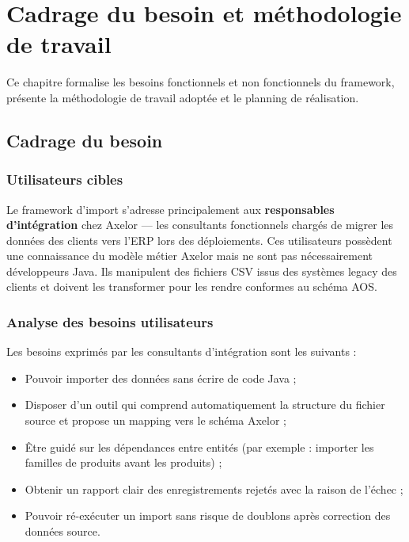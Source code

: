 \chapter{Cadrage du besoin et méthodologie de travail}
\label{chap:cadrage}

Ce chapitre formalise les besoins fonctionnels et non fonctionnels du framework, présente la méthodologie de travail adoptée et le planning de réalisation.

\section{Cadrage du besoin}

\subsection{Utilisateurs cibles}

Le framework d'import s'adresse principalement aux \textbf{responsables d'intégration} chez Axelor — les consultants fonctionnels chargés de migrer les données des clients vers l'ERP lors des déploiements. Ces utilisateurs possèdent une connaissance du modèle métier Axelor mais ne sont pas nécessairement développeurs Java. Ils manipulent des fichiers CSV issus des systèmes legacy des clients et doivent les transformer pour les rendre conformes au schéma AOS.

\subsection{Analyse des besoins utilisateurs}

Les besoins exprimés par les consultants d'intégration sont les suivants :
\begin{itemize}
    \item Pouvoir importer des données sans écrire de code Java ;
    \item Disposer d'un outil qui comprend automatiquement la structure du fichier source et propose un mapping vers le schéma Axelor ;
    \item Être guidé sur les dépendances entre entités (par exemple : importer les familles de produits avant les produits) ;
    \item Obtenir un rapport clair des enregistrements rejetés avec la raison de l'échec ;
    \item Pouvoir ré-exécuter un import sans risque de doublons après correction des données source.
\end{itemize}

